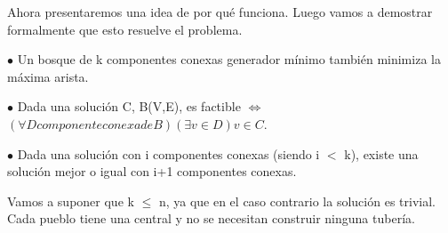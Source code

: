 Ahora presentaremos una idea de por qué funciona. Luego vamos a demostrar formalmente que esto resuelve el problema. 

$\bullet$ Un bosque de k componentes conexas generador mínimo también minimiza la máxima arista.

$\bullet$ Dada una solución C, B(V,E), es factible $\Longleftrightarrow$ $(\forall D componente conexa de B)(\exists v \in D) v \in C$.  

$\bullet$ Dada una solución con i componentes conexas (siendo i $<$ k), existe una solución mejor o igual con i+1 componentes conexas.

Vamos a suponer que k $\leq$ n, ya que en el caso contrario la solución es trivial. Cada pueblo tiene una central y no se necesitan construir ninguna tubería.